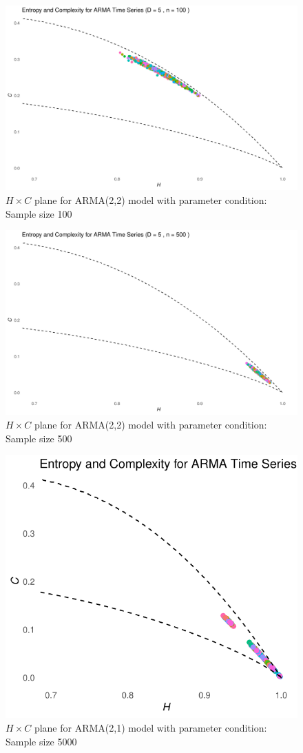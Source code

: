 \documentclass[12pt,a4paper]{article}
\begin{document}
\begin{figure}[H]
	\includegraphics[width=0.8 \textwidth]{HC plane ARMA(22) n100}
	\caption{$H \times C$ plane for ARMA(2,2) model with parameter condition: Sample size 100}
	\label{fig:HC ARMA(22) constraint n100}
\end{figure}

\begin{figure}[H]
	\includegraphics[width=0.8 \textwidth]{HC plane ARMA(22) n500}
	\caption{$H \times C$ plane for ARMA(2,2) model with parameter condition: Sample size 500}
	\label{fig:HC ARMA(22) constraint n500}
\end{figure}			
	
\begin{figure}[H]
	\includegraphics[width=0.8 \textwidth]{HC plane ARMA21 n5000}
	\caption{$H \times C$ plane for ARMA(2,1) model with parameter condition: Sample size 5000}
	\label{fig:HC ARMA(21)}
\end{figure}	
\end{document}
